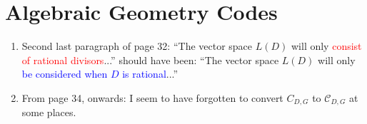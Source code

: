\documentclass[11pt,a4paper,oneside,openright,english]{article}
\begin{document}
\section{Algebraic Geometry Codes}%
\begin{enumerate}
  \item Second last paragraph of page 32: ``The vector space $L(D)$ will only \textcolor{red}{consist of rational divisors}...'' should have been: ``The vector space $L(D)$ will only \textcolor{blue}{be considered when $D$ is rational}...''
  \item From page 34, onwards: I seem to have forgotten to convert $C_{D, G}$ to $\mathcal{C}_{D, G}$ at some places.
\end{enumerate}
\end{document}
